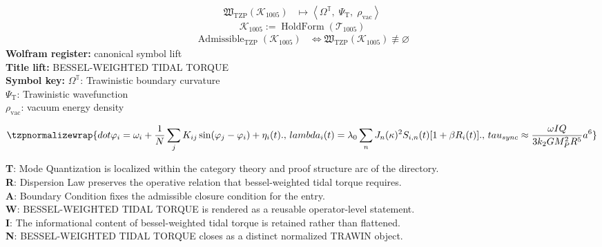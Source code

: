 \noindent
\begin{minipage}[t]{0.48\linewidth}
\begingroup
\small
\[
\begin{aligned}
\mathfrak{W}_{\mathrm{TZP}}\!\left(\mathcal{K}_{1005}\right)
&\longmapsto
\left\langle \Omega^{\mathbb{T}},\; \Psi_{\mathrm{T}},\; \rho_{\mathrm{vac}} \right\rangle
\end{aligned}
\]
\[
\mathcal{K}_{1005}
:=
\operatorname{HoldForm}\!\left(\mathcal{T}_{1005}\right)
\]
\[
\begin{aligned}
\operatorname{Admissible}_{\mathrm{TZP}}\!\left(\mathcal{K}_{1005}\right)
&\Longleftrightarrow
\mathfrak{W}_{\mathrm{TZP}}\!\left(\mathcal{K}_{1005}\right)\not\equiv\varnothing
\end{aligned}
\]
\textbf{Wolfram register:} canonical symbol lift\\
\textbf{Title lift:} BESSEL-WEIGHTED TIDAL TORQUE\\
\textbf{Symbol key:} \(\Omega^{\mathbb{T}}\): Trawinistic boundary curvature\\ \(\Psi_{\mathrm{T}}\): Trawinistic wavefunction\\ \(\rho_{\mathrm{vac}}\): vacuum energy density
\par
\endgroup
\end{minipage}\hfill
\begin{minipage}[t]{0.48\linewidth}
\[
\tzpnormalizewrap{dot\varphi_i = \omega_i + \frac{1}{N}\sum_j K_{ij}\sin(\varphi_j-\varphi_i) + \eta_i(t).,\,lambda_i(t) = \lambda_0 \sum_n J_n(\kappa)^2 S_{i,n}(t) [1+\beta R_i(t)].,\,tau_{sync} \approx \frac{\omega I Q}{3 k_2 G M_P^2 R^5} a^6}
\]

\small
\textbf{T}: Mode Quantization is localized within the category theory and proof structure arc of the directory.\\
\textbf{R}: Dispersion Law preserves the operative relation that bessel-weighted tidal torque requires.\\
\textbf{A}: Boundary Condition fixes the admissible closure condition for the entry.\\
\textbf{W}: BESSEL-WEIGHTED TIDAL TORQUE is rendered as a reusable operator-level statement.\\
\textbf{I}: The informational content of bessel-weighted tidal torque is retained rather than flattened.\\
\textbf{N}: BESSEL-WEIGHTED TIDAL TORQUE closes as a distinct normalized TRAWIN object.
\normalsize
\end{minipage}

